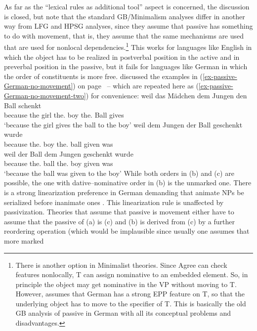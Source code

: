 As far as the ``lexical rules as additional tool'' aspect is concerned, the discussion is closed, but
note that the standard GB/Minimalism analyses differ in another way from LFG and HPSG analyses,
since they assume that passive has something to do with movement, that is, they assume that the same mechanisms
are used that are used for nonlocal dependencies.\footnote{%
  There is another option in Minimalist theories. Since Agree can check features
  nonlocally, T can assign nominative to an embedded element. So, in principle the object may get
  nominative in the VP without moving to T. However, \citet[]{Adger2003a} assumes that German has a
  strong EPP feature on T, so that the underlying object has to move to the specifier of T. This is
  basically the old GB analysis of passive in German with all its conceptual problems and disadvantages.
}
This works for languages like English in which
the object has to be realized in postverbal position in the active and in preverbal position in the
passive, but it fails for languages like German in which the order of constituents is more free.
\citet[Section~4.4.3]{Lenerz77} discussed the examples in (\ref{ex-passive-German-no-movement}) on
page~\pageref{ex-passive-German-no-movement} -- which are repeated here as
(\ref{ex-passive-German-no-movement-two}) for convenience:
\eal
\label{ex-passive-German-no-movement-two}
\ex 
\gll weil das Mädchen dem Jungen den Ball schenkt\\
     because the girl the.\dat{} boy the.\acc{} Ball gives\\
\glt `because the girl gives the ball to the boy'
\ex 
\gll weil dem Jungen der Ball geschenkt wurde\\
     because the.\dat{} boy the.\nom{} ball given was\\
\ex 
\gll weil der Ball dem Jungen geschenkt wurde\\
     because the.\nom{} ball the.\dat{} boy given was\\
\glt `because the ball was given to the boy'
\zl
While both orders in (b) and (c) are possible, the one with dative--nominative order
in (b) is the unmarked one. There is a strong linearization preference in German demanding that
animate NPs be serialized before inanimate ones \citep[]{Hoberg81a}. This linearization rule is
unaffected by passivization. 
Theories that assume that passive is movement either have to
assume that the passive of (a) is (c) and (b) is derived from (c) by a
further reordering operation (which would be implausible since usually one assumes that more marked
